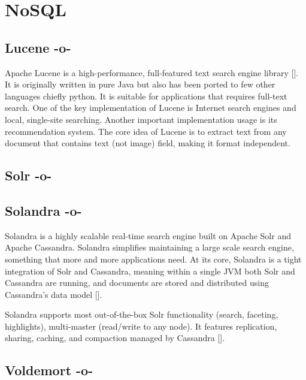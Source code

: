 \section{NoSQL}

\subsection{Lucene -o-}

Apache Lucene is a high-performance, full-featured text search engine
library [\cite{www-lucene}].  It is originally written in pure Java but
also has been ported to few other languages chiefly python.  It is
suitable for applications that requires full-text search.  One of the
key implementation of Lucene is Internet search engines and local,
single-site searching.  Another important implementation usage is its
recommendation system. The core idea of Lucene is to extract text from
any document that contains text (not image) field, making it format
independent.



\subsection{Solr -o-}



\subsection{Solandra -o-}
     
Solandra is a highly scalable real-time search engine built on Apache
Solr and Apache Cassandra. Solandra simplifies maintaining a large
scale search engine, something that more and more applications
need. At its core, Solandra is a tight integration of Solr and
Cassandra, meaning within a single JVM both Solr and Cassandra are
running, and documents are stored and distributed using Cassandra's
data model [\cite{github-solandra}].

Solandra supports most out-of-the-box Solr functionality (search,
faceting, highlights), multi-master (read/write to any node). It
features replication, sharing, caching, and compaction managed by
Cassandra [\cite{github-solandra2}].


    
\subsection{Voldemort -o-}

